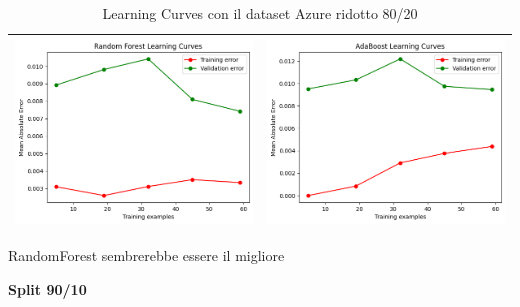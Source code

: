 \begin{table}[H]
\begin{tabularx}{\textwidth}{|X|X|}
        \includegraphics[width=\linewidth, trim=0 0 0 0]{images/RandomForest_lc80_ridottoAzure.png} &
        \includegraphics[width=\linewidth, trim=0 0 0 0]{images/AdaBoost_lc80_ridottoAzure.png} \\
        \hline
    \end{tabularx}
    \caption{Learning Curves con il dataset Azure ridotto 80/20}
    \label{tab:emissions_info}
\end{table}

\noindent RandomForest sembrerebbe essere il migliore



\noindent\textbf{Split 90/10}

